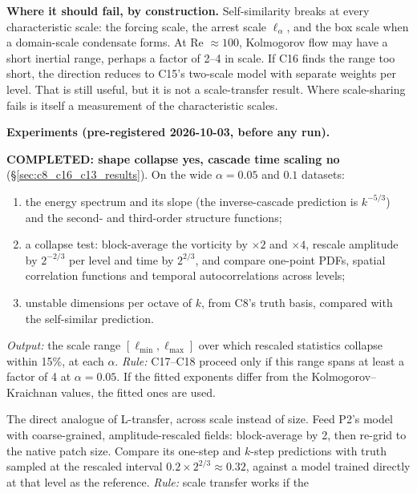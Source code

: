 \documentclass[11pt]{article}
\begin{document}
\textbf{Where it should fail, by construction.} Self-similarity breaks at
every characteristic scale: the forcing scale, the arrest scale
$\ell_\alpha$, and the box scale when a domain-scale condensate forms.
At Re $\approx100$, Kolmogorov flow may have a short inertial range,
perhaps a factor of 2--4 in scale. If C16 finds the range too short, the
direction reduces to C15's two-scale model with separate weights per
level. That is still useful, but it is not a scale-transfer result.
Where scale-sharing fails is itself a measurement of the characteristic
scales.

\textbf{Experiments (pre-registered 2026-10-03, before any run).}
\begin{description}[leftmargin=*]
\item[C16 --- self-similarity diagnostic (no training, cheap).] \textbf{COMPLETED: shape collapse yes, cascade time scaling no} (\S\ref{sec:c8_c16_c13_results}). On the
  wide $\alpha{=}0.05$ and $0.1$ datasets:
  \begin{enumerate}[label=(\roman*),leftmargin=*]
  \item the energy spectrum and its slope (the inverse-cascade
    prediction is $k^{-5/3}$) and the second- and third-order structure
    functions;
  \item a collapse test: block-average the vorticity by $\times2$ and
    $\times4$, rescale amplitude by $2^{-2/3}$ per level and time by
    $2^{2/3}$, and compare one-point PDFs, spatial correlation functions
    and temporal autocorrelations across levels;
  \item unstable dimensions per octave of $k$, from C8's truth basis,
    compared with the self-similar prediction.
  \end{enumerate}
  \emph{Output:} the scale range $[\ell_{\min},\ell_{\max}]$ over which
  rescaled statistics collapse within 15\%, at each $\alpha$.
  \emph{Rule:} C17--C18 proceed only if this range spans at least a
  factor of 4 at $\alpha{=}0.05$. If the fitted exponents differ from the
  Kolmogorov--Kraichnan values, the fitted ones are used.
\item[C17 --- zero-shot scale transfer.] The direct analogue of
  L-transfer, across scale instead of size. Feed P2's model with
  coarse-grained, amplitude-rescaled fields: block-average by 2, then
  re-grid to the native patch size. Compare its one-step and $k$-step
  predictions with truth sampled at the rescaled interval
  $0.2\times2^{2/3}\approx0.32$, against a model trained directly at that
  level as the reference. \emph{Rule:} scale transfer works if the

\end{description}
\end{document}

